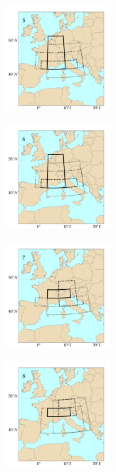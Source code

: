 \documentclass{ametsoc}
\begin{document}
\begin{figure}[htb]
	\begin{subfigure}{.5\columnwidth}
		\centering
		\includegraphics[width=3.9cm]{figures/spatial_win_z4/Spatial_windows_5.png}
	\end{subfigure}%
	\begin{subfigure}{.5\columnwidth}
		\centering
		\includegraphics[width=3.9cm]{figures/spatial_win_z4/Spatial_windows_6.png}
	\end{subfigure}
	\begin{subfigure}{.5\columnwidth}
		\centering
		\includegraphics[width=3.9cm]{figures/spatial_win_z4/Spatial_windows_7.png}
	\end{subfigure}%
	\begin{subfigure}{.5\columnwidth}
		\centering
		\includegraphics[width=3.9cm]{figures/spatial_win_z4/Spatial_windows_8.png}
	\end{subfigure}
	\begin{subfigure}{.5\columnwidth}

\end{subfigure}
\end{figure}
\end{document}
